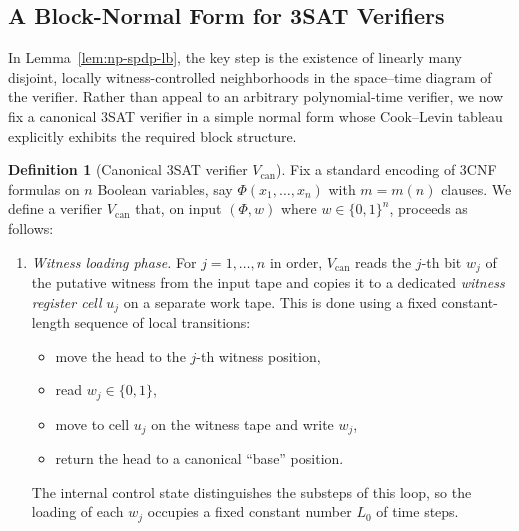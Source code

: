 \documentclass[12pt]{article}
\theoremstyle{definition}
\newtheorem{definition}{Definition}
\theoremstyle{definition}
\theoremstyle{remark}
\theoremstyle{remark}
\begin{document}
\subsection{A Block-Normal Form for 3SAT Verifiers}
\label{sec:verifier-block-normal-form}

In Lemma~\ref{lem:np-spdp-lb}, the key step is the existence of
linearly many disjoint, locally witness-controlled neighborhoods in the
space--time diagram of the verifier. Rather than appeal to an arbitrary
polynomial-time verifier, we now fix a canonical 3SAT verifier in a simple
normal form whose Cook--Levin tableau explicitly exhibits the required block
structure.

\begin{definition}[Canonical 3SAT verifier $V_{\mathrm{can}}$]
\label{def:canonical-verifier}
Fix a standard encoding of 3CNF formulas on $n$ Boolean variables, say
$\Phi(x_1,\dots,x_n)$ with $m = m(n)$ clauses. We define a verifier
$V_{\mathrm{can}}$ that, on input $(\Phi,w)$ where $w \in \{0,1\}^n$, proceeds
as follows:

\begin{enumerate}[label=(\arabic*)]
  \item \emph{Witness loading phase.} For $j = 1,\dots,n$ in order,
  $V_{\mathrm{can}}$ reads the $j$-th bit $w_j$ of the putative witness from
  the input tape and copies it to a dedicated \emph{witness register cell}
  $u_j$ on a separate work tape. This is done using a fixed constant-length
  sequence of local transitions:
  \begin{itemize}
    \item move the head to the $j$-th witness position,
    \item read $w_j \in \{0,1\}$,
    \item move to cell $u_j$ on the witness tape and write $w_j$,
    \item return the head to a canonical ``base'' position.
  \end{itemize}
  The internal control state distinguishes the substeps of this loop, so the
  loading of each $w_j$ occupies a fixed constant number $L_0$ of time steps.


\end{enumerate}
\end{definition}
\end{document}

